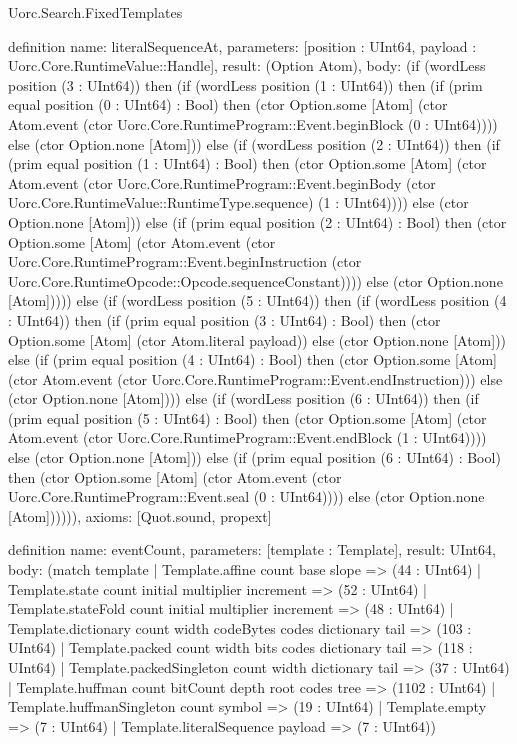 \begin{lexlean}{Uorc.Search.FixedTemplates}
\begin{semanticmodule}
definition{
  name: literalSequenceAt,
  parameters: [position : UInt64, payload : Uorc.Core.RuntimeValue::Handle],
  result: (Option Atom),
  body: (if (wordLess position (3 : UInt64)) then (if (wordLess position (1 : UInt64)) then (if (prim equal position (0 : UInt64) : Bool) then (ctor Option.some [Atom] (ctor Atom.event (ctor Uorc.Core.RuntimeProgram::Event.beginBlock (0 : UInt64)))) else (ctor Option.none [Atom])) else (if (wordLess position (2 : UInt64)) then (if (prim equal position (1 : UInt64) : Bool) then (ctor Option.some [Atom] (ctor Atom.event (ctor Uorc.Core.RuntimeProgram::Event.beginBody (ctor Uorc.Core.RuntimeValue::RuntimeType.sequence) (1 : UInt64)))) else (ctor Option.none [Atom])) else (if (prim equal position (2 : UInt64) : Bool) then (ctor Option.some [Atom] (ctor Atom.event (ctor Uorc.Core.RuntimeProgram::Event.beginInstruction (ctor Uorc.Core.RuntimeOpcode::Opcode.sequenceConstant)))) else (ctor Option.none [Atom])))) else (if (wordLess position (5 : UInt64)) then (if (wordLess position (4 : UInt64)) then (if (prim equal position (3 : UInt64) : Bool) then (ctor Option.some [Atom] (ctor Atom.literal payload)) else (ctor Option.none [Atom])) else (if (prim equal position (4 : UInt64) : Bool) then (ctor Option.some [Atom] (ctor Atom.event (ctor Uorc.Core.RuntimeProgram::Event.endInstruction))) else (ctor Option.none [Atom]))) else (if (wordLess position (6 : UInt64)) then (if (prim equal position (5 : UInt64) : Bool) then (ctor Option.some [Atom] (ctor Atom.event (ctor Uorc.Core.RuntimeProgram::Event.endBlock (1 : UInt64)))) else (ctor Option.none [Atom])) else (if (prim equal position (6 : UInt64) : Bool) then (ctor Option.some [Atom] (ctor Atom.event (ctor Uorc.Core.RuntimeProgram::Event.seal (0 : UInt64)))) else (ctor Option.none [Atom]))))),
  axioms: [Quot.sound, propext]
}

definition{
  name: eventCount,
  parameters: [template : Template],
  result: UInt64,
  body: (match template
    | Template.affine count base slope => (44 : UInt64)
    | Template.state count initial multiplier increment => (52 : UInt64)
    | Template.stateFold count initial multiplier increment => (48 : UInt64)
    | Template.dictionary count width codeBytes codes dictionary tail => (103 : UInt64)
    | Template.packed count width bits codes dictionary tail => (118 : UInt64)
    | Template.packedSingleton count width dictionary tail => (37 : UInt64)
    | Template.huffman count bitCount depth root codes tree => (1102 : UInt64)
    | Template.huffmanSingleton count symbol => (19 : UInt64)
    | Template.empty => (7 : UInt64)
    | Template.literalSequence payload => (7 : UInt64))
}


\end{semanticmodule}
\end{lexlean}
